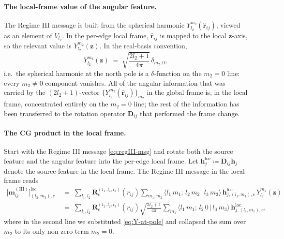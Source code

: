 \documentclass[11pt,a4paper]{article}
\newcommand{\brh}{\hat{\bm{r}}}
\newcommand{\bz}{\bm{z}}
\newcommand{\bh}{\bm{h}}
\newcommand{\bD}{\bm{D}}
\theoremstyle{plain}
\theoremstyle{definition}
\theoremstyle{remark}
\begin{document}
    \paragraph{The local-frame value of the angular feature.}
    The Regime III message is built from the spherical harmonic
$Y_{l_2}^{m_2}(\brh_{ij})$, viewed as an element of $V_{l_2}$. In the per-edge
    local frame, $\brh_{ij}$ is mapped to the local $\bz$-axis, so the relevant
    value is $Y_{l_2}^{m_2}(\bz)$. In the real-basis convention,
    \begin{equation}\label{eq:Y-at-pole}
        Y_{l_2}^{m_2}(\bz)\;=\;\sqrt{\frac{2l_2+1}{4\pi}}\,\delta_{m_2,0},
    \end{equation}
    i.e.\ the spherical harmonic at the north pole is a $\delta$-function on the $m_2=0$ line: every $m_2\ne 0$ component vanishes.
    All of the angular information that was carried by the $(2l_2+1)$-vector $\{Y_{l_2}^{m_2}(\brh_{ij})\}_{m_2}$ in the global frame is, in the local frame, concentrated entirely on the $m_2=0$ line; the rest of the information has been transferred to the rotation operator $\bD_{ij}$ that performed the frame change.

    \paragraph{The CG product in the local frame.}
    Start with the Regime III message \eqref{eq:regIII-msg} and rotate both the
    source feature and the angular feature into the per-edge local frame. Let
$\bh^{\mathrm{loc}}_j\coloneqq\bD_{ij}\bh_j$ denote the source feature in the
    local frame. The Regime III message in the local frame reads
    \begin{align}\label{eq:regIII-loc-1}
        \bigl[\bm{m}_{ij}^{\mathrm{(III)}}\bigr]^{\mathrm{loc}}_{(l_3,m_3),c}
        \; & =\;\sum_{l_1,l_2}\bm{R}^{(l_1,l_2,l_3)}_c(r_{ij})\sum_{m_1,m_2}\bigl\langle l_1\,m_1;\,l_2\,m_2\,\big|\,l_3\,m_3\bigr\rangle\,\bh^{\mathrm{loc}}_{j,(l_1,m_1),c}\,Y_{l_2}^{m_2}(\bz)                         \\
        \; & =\;\sum_{l_1,l_2}\bm{R}^{(l_1,l_2,l_3)}_c(r_{ij})\sqrt{\frac{2l_2+1}{4\pi}}\sum_{m_1}\bigl\langle l_1\,m_1;\,l_2\,0\,\big|\,l_3\,m_3\bigr\rangle\,\bh^{\mathrm{loc}}_{j,(l_1,m_1),c},\label{eq:regIII-loc-2}
    \end{align}
    where in the second line we substituted \eqref{eq:Y-at-pole} and collapsed the sum over $m_2$ to its only non-zero term $m_2=0$.
\end{document}

